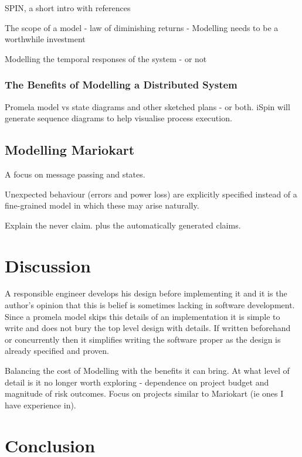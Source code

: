 SPIN, a short intro with references

The scope of a model - law of diminishing returns - Modelling needs to be a worthwhile investment

Modelling the temporal responses of the system - or not

\subsubsection{The Benefits of Modelling a Distributed System}
Promela model vs state diagrams and other sketched plans - or both. iSpin will
 generate sequence diagrams to help visualise process execution.

\subsection{Modelling Mariokart}
A focus on message passing and states.

Unexpected behaviour (errors and power loss) are explicitly specified instead of 
a fine-grained model in which these may arise naturally.

Explain the never claim. plus the automatically generated claims.


\section{Discussion}
A responsible engineer develops his design before implementing it and it is the author's opinion 
that this is belief is sometimes lacking in software development. Since a promela model skips
this details of an implementation it is simple to write and does not bury the top level design 
with details. If written beforehand or concurrently then it simplifies writing the software proper
as the design is already specified and proven.

Balancing the cost of Modelling with the benefits it can bring. At what level of detail is it no longer worth 
exploring - dependence on project budget and magnitude of risk outcomes. Focus on projects similar to
Mariokart (ie ones I have experience in).

\section{Conclusion}
